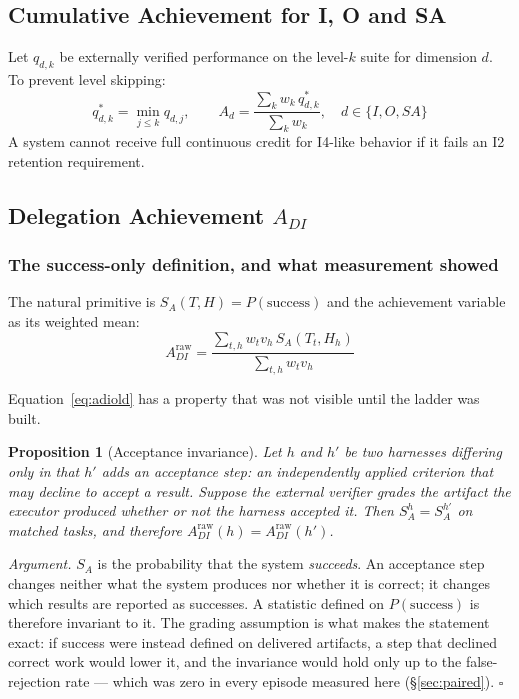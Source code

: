 \documentclass[11pt]{article}
\newtheorem{proposition}{Proposition}
\theoremstyle{definition}
\newcommand{\SA}{\ensuremath{S_A(T,H)}}
\begin{document}
\subsection{Cumulative Achievement for I, O and SA}

Let $q_{d,k}$ be externally verified performance on the level-$k$ suite for dimension $d$. To prevent level skipping:
\begin{equation}
q^{*}_{d,k} = \min_{j \le k} q_{d,j}, \qquad
A_d = \frac{\sum_k w_k\, q^{*}_{d,k}}{\sum_k w_k}, \quad d \in \{I,O,SA\}
\end{equation}
A system cannot receive full continuous credit for I4-like behavior if it fails an I2 retention requirement.

\subsection{Delegation Achievement \texorpdfstring{$A_{DI}$}{A-DI}}\label{sec:adi}

\subsubsection{The success-only definition, and what measurement showed}

The natural primitive is $\SA{} = P(\text{success})$ and the achievement variable as its weighted mean:
\begin{equation}
A_{DI}^{\mathrm{raw}} = \frac{\sum_{t,h} w_t v_h\, S_A(T_t,H_h)}{\sum_{t,h} w_t v_h}
\label{eq:adiold}
\end{equation}

Equation~\eqref{eq:adiold} has a property that was not visible until the ladder was built.

\begin{proposition}[Acceptance invariance]\label{prop:blind}
Let $h$ and $h'$ be two harnesses differing only in that $h'$ adds an acceptance step: an independently applied criterion that may decline to accept a result. Suppose the external verifier grades the artifact the executor produced whether or not the harness accepted it. Then $S_A^{h} = S_A^{h'}$ on matched tasks, and therefore $A_{DI}^{\mathrm{raw}}(h) = A_{DI}^{\mathrm{raw}}(h')$.
\end{proposition}

\emph{Argument.} $S_A$ is the probability that the system \emph{succeeds}. An acceptance step changes neither what the system produces nor whether it is correct; it changes which results are reported as successes. A statistic defined on $P(\text{success})$ is therefore invariant to it. The grading assumption is what makes the statement exact: if success were instead defined on delivered artifacts, a step that declined correct work would lower it, and the invariance would hold only up to the false-rejection rate --- which was zero in every episode measured here (\S\ref{sec:paired}). \hfill$\square$
\end{document}
